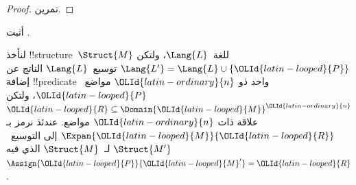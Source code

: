 \documentclass[../../../include/open-logic-section]{subfiles}
\begin{document}
\begin{proof}
  تمرين.
\end{proof}

\begin{prob}
أثبت .
\end{prob}

\begin{defn}
لنأخذ !!{structure}~$\Struct{M}$ للغة~$\Lang{L}$، ولتكن
$\Lang{L'} = \Lang{L} \cup \{{\OLId{latin-looped}{P}}\}$ توسيع~$\Lang{L}$ الناتج عن إضافة
!!{predicate} واحد ذو ${\OLId{latin-ordinary}{n}}$ مواضع~${\OLId{latin-looped}{P}}$، ولتكن ${\OLId{latin-looped}{R}} \subseteq \Domain{{\OLId{latin-looped}{M}}}^{\OLId{latin-ordinary}{n}}$
علاقة ذات ${\OLId{latin-ordinary}{n}}$ مواضع. عندئذ نرمز بـ $\Expan{{\OLId{latin-looped}{M}}}{{\OLId{latin-looped}{R}}}$ إلى التوسيع~$\Struct{M'}$
لـ~$\Struct{M}$ الذي فيه $\Assign{{\OLId{latin-looped}{P}}}{{\OLId{latin-looped}{M}}'} = {\OLId{latin-looped}{R}}$.
\end{defn}
\end{document}
